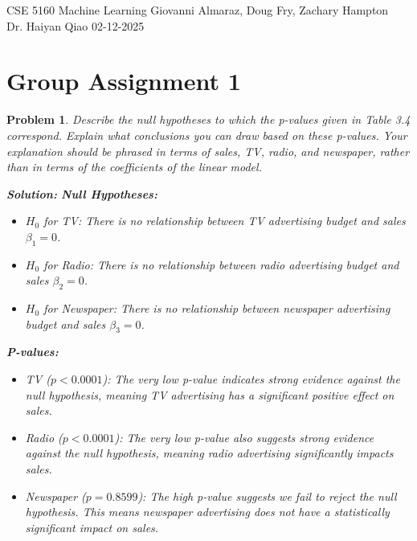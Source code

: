 \documentclass[12pt]{article}
\newtheorem{problem}{Problem} %
\theoremstyle{definition}
\newcommand{\solution}{\textcolor{PineGreen}{\textbf{Solution:}}\newline}
\begin{document}
\begin{flushright}
CSE 5160 Machine Learning \hfill Giovanni Almaraz, Doug Fry, Zachary Hampton\\
Dr. Haiyan Qiao \hfill 02-12-2025
\end{flushright}

\bigskip

\section*{Group Assignment 1}

\begin{problem}
Describe the null hypotheses to which the p-values given in Table 3.4
correspond. Explain what conclusions you can draw based on these
p-values. Your explanation should be phrased in terms of sales, TV,
radio, and newspaper, rather than in terms of the coefficients of the
linear model.

\solution
\textbf{Null Hypotheses:}
\begin{itemize}
    \item \( H_0 \) for TV: There is no relationship between TV advertising budget and sales \(\beta_1 = 0\).
    \item \( H_0 \) for Radio: There is no relationship between radio advertising budget and sales \(\beta_2 = 0\).
    \item \( H_0 \) for Newspaper: There is no relationship between newspaper advertising budget and sales \(\beta_3 = 0\).
\end{itemize}

\textbf{P-values:}
\begin{itemize}
    \item TV (\( p < 0.0001 \)): The very low p-value indicates strong evidence against the null hypothesis, meaning TV advertising has a significant positive effect on sales.
    \item Radio (\( p < 0.0001 \)): The very low p-value also suggests strong evidence against the null hypothesis, meaning radio advertising significantly impacts sales.
    \item Newspaper (\( p = 0.8599 \)): The high p-value suggests we fail to reject the null hypothesis. This means newspaper advertising does not have a statistically significant impact on sales.
\end{itemize}
\end{problem}

\bigskip

\setcounter{problem}{2}
\end{document}
